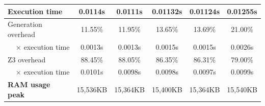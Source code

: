 \documentclass[english,runningheads]{llncs}
\begin{document}
\begin{table}[]
{\begin{tabular}{l||lllll}
\textbf{Execution time}                & \multicolumn{1}{c|}{0.0114s}  & \multicolumn{1}{c|}{0.0111s}  & \multicolumn{1}{c|}{0.01132s} & \multicolumn{1}{c|}{0.01124s} & \multicolumn{1}{c}{0.01255s} \\ \hline
Generation overhead                    & \multicolumn{1}{c|}{11.55\%}  & \multicolumn{1}{c|}{11.95\%}  & \multicolumn{1}{c|}{13.65\%}  & \multicolumn{1}{c|}{13.69\%}  & \multicolumn{1}{c}{21.00\%} \\ \hline
\multicolumn{1}{r||}{× execution time} & \multicolumn{1}{c|}{0.0013s}  & \multicolumn{1}{c|}{0.0013s}  & \multicolumn{1}{c|}{0.0015s}  & \multicolumn{1}{c|}{0.0015s}  & \multicolumn{1}{c}{0.0026s} \\ \hline
Z3 overhead                            & \multicolumn{1}{c|}{88.45\%}  & \multicolumn{1}{c|}{88.05\%}  & \multicolumn{1}{c|}{86.35\%}  & \multicolumn{1}{c|}{86.31\%}  & \multicolumn{1}{c}{79.00\%} \\ \hline
\multicolumn{1}{r||}{× execution time} & \multicolumn{1}{c|}{0.0101s}  & \multicolumn{1}{c|}{0.0098s}  & \multicolumn{1}{c|}{0.0098s}  & \multicolumn{1}{c|}{0.0097s}  & \multicolumn{1}{c}{0.0099s} \\ \hline
\textbf{RAM usage peak}                & \multicolumn{1}{c|}{15,536KB} & \multicolumn{1}{c|}{15,364KB} & \multicolumn{1}{c|}{15,400KB} & \multicolumn{1}{c|}{15,364KB} & \multicolumn{1}{c}{15,540KB}

\end{tabular}
}
\end{table}
\end{document}
